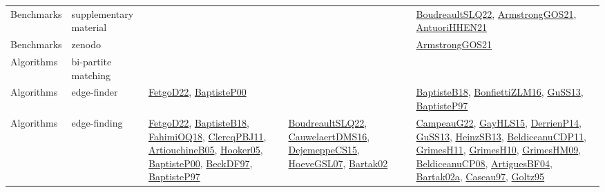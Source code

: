 {\begin{longtable}{lp{3cm}>{\raggedright}p{6cm}>{\raggedright}p{6cm}p{8cm}}
Benchmarks & supplementary material &  &  & \href{papers/BoudreaultSLQ22.pdf}{BoudreaultSLQ22}\cite{BoudreaultSLQ22}, \href{papers/ArmstrongGOS21.pdf}{ArmstrongGOS21}\cite{ArmstrongGOS21}, \href{papers/AntuoriHHEN21.pdf}{AntuoriHHEN21}\cite{AntuoriHHEN21}\\
Benchmarks & zenodo &  &  & \href{papers/ArmstrongGOS21.pdf}{ArmstrongGOS21}\cite{ArmstrongGOS21}\\
Algorithms & bi-partite matching &  &  & \\
Algorithms & edge-finder & \href{articles/FetgoD22.pdf}{FetgoD22}\cite{FetgoD22}, \href{articles/BaptisteP00.pdf}{BaptisteP00}\cite{BaptisteP00} &  & \href{articles/BaptisteB18.pdf}{BaptisteB18}\cite{BaptisteB18}, \href{papers/BonfiettiZLM16.pdf}{BonfiettiZLM16}\cite{BonfiettiZLM16}, \href{papers/GuSS13.pdf}{GuSS13}\cite{GuSS13}, \href{papers/BaptisteP97.pdf}{BaptisteP97}\cite{BaptisteP97}\\
Algorithms & edge-finding & \href{articles/FetgoD22.pdf}{FetgoD22}\cite{FetgoD22}, \href{articles/BaptisteB18.pdf}{BaptisteB18}\cite{BaptisteB18}, \href{articles/FahimiOQ18.pdf}{FahimiOQ18}\cite{FahimiOQ18}, \href{papers/ClercqPBJ11.pdf}{ClercqPBJ11}\cite{ClercqPBJ11}, \href{papers/ArtiouchineB05.pdf}{ArtiouchineB05}\cite{ArtiouchineB05}, \href{articles/Hooker05.pdf}{Hooker05}\cite{Hooker05}, \href{articles/BaptisteP00.pdf}{BaptisteP00}\cite{BaptisteP00}, \href{papers/BeckDF97.pdf}{BeckDF97}\cite{BeckDF97}, \href{papers/BaptisteP97.pdf}{BaptisteP97}\cite{BaptisteP97} & \href{papers/BoudreaultSLQ22.pdf}{BoudreaultSLQ22}\cite{BoudreaultSLQ22}, \href{papers/CauwelaertDMS16.pdf}{CauwelaertDMS16}\cite{CauwelaertDMS16}, \href{papers/DejemeppeCS15.pdf}{DejemeppeCS15}\cite{DejemeppeCS15}, \href{papers/HoeveGSL07.pdf}{HoeveGSL07}\cite{HoeveGSL07}, \href{papers/Bartak02.pdf}{Bartak02}\cite{Bartak02} & \href{articles/CampeauG22.pdf}{CampeauG22}\cite{CampeauG22}, \href{papers/GayHLS15.pdf}{GayHLS15}\cite{GayHLS15}, \href{papers/DerrienP14.pdf}{DerrienP14}\cite{DerrienP14}, \href{papers/GuSS13.pdf}{GuSS13}\cite{GuSS13}, \href{articles/HeinzSB13.pdf}{HeinzSB13}\cite{HeinzSB13}, \href{articles/BeldiceanuCDP11.pdf}{BeldiceanuCDP11}\cite{BeldiceanuCDP11}, \href{papers/GrimesH11.pdf}{GrimesH11}\cite{GrimesH11}, \href{papers/GrimesH10.pdf}{GrimesH10}\cite{GrimesH10}, \href{papers/GrimesHM09.pdf}{GrimesHM09}\cite{GrimesHM09}, \href{papers/BeldiceanuCP08.pdf}{BeldiceanuCP08}\cite{BeldiceanuCP08}, \href{papers/ArtiguesBF04.pdf}{ArtiguesBF04}\cite{ArtiguesBF04}, \href{papers/Bartak02a.pdf}{Bartak02a}\cite{Bartak02a}, \href{papers/Caseau97.pdf}{Caseau97}\cite{Caseau97}, \href{papers/Goltz95.pdf}{Goltz95}\cite{Goltz95}\\

\end{longtable}}
